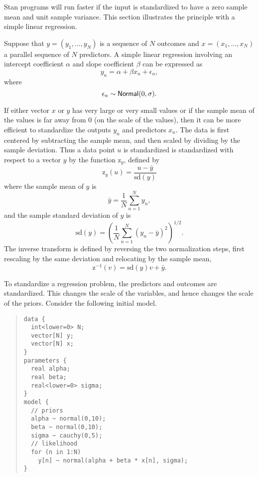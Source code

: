 Stan programs will run faster if the input is standardized to have a
zero sample mean and unit sample variance.  This section illustrates
the principle with a simple linear regression.

Suppose that $y = (y_1,\ldots,y_N)$ is a sequence of $N$ outcomes and
$x = (x_1,\ldots,x_N)$ a parallel sequence of $N$ predictors.  A
simple linear regression involving an intercept coefficient $\alpha$
and slope coefficient $\beta$ can be expressed as
\[
y_n = \alpha + \beta x_n + \epsilon_n,
\]
where
\[
\epsilon_n \sim \mbox{\sf Normal}(0,\sigma).
\]

If either vector $x$ or $y$ has very large or very small values or if the
sample mean of the values is far away from 0 (on the scale of the values),
then it can be more efficient to standardize the outputs $y_n$ and
predictors $x_n$.  The data is first centered by subtracting the
sample mean, and then scaled by dividing by the sample deviation.
Thus a data point $u$ is standardized is standardized with respect to
a vector $y$  by the function $\mbox{z}_y$, defined by
\[
\mbox{z}_y(u) = \frac{u - \bar{y}}{\mbox{sd}(y)}
\]
where the sample mean of $y$ is
\[
\bar{y}
= \frac{1}{N} \sum_{n=1}^N y_n,
\]
and the sample standard deviation of $y$ is
\[
\mbox{sd}(y) 
= \left( 
\frac{1}{N} \sum_{n=1}^N (y_n - \bar{y})^2
\right)^{1/2}.
\]
The inverse transform is
defined by reversing the two normalization steps, first rescaling by
the same deviation and relocating by the sample mean,
\[
\mbox{z}^{-1}(v) = \mbox{sd}(y) v + \bar{y}.
\]

To standardize a regression problem, the predictors and outcomes are
standardized.  This changes the scale of the variables, and hence
changes the scale of the priors.  Consider the following initial
model.
%
\begin{quote}
\begin{Verbatim}[fontsize=\small]
data {
  int<lower=0> N;
  vector[N] y;
  vector[N] x;
}
parameters {
  real alpha;
  real beta;
  real<lower=0> sigma;
}
model {
  // priors
  alpha ~ normal(0,10);    
  beta ~ normal(0,10);
  sigma ~ cauchy(0,5);
  // likelihood
  for (n in 1:N)
    y[n] ~ normal(alpha + beta * x[n], sigma);
}
\end{Verbatim}
\end{quote}
%

